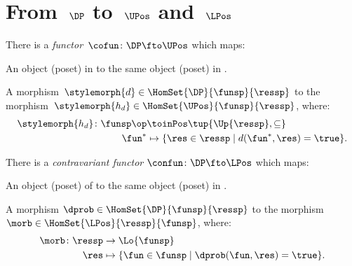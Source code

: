 \section{From~$\DP$ to~$\UPos$ and~$\LPos$}
\begin{lemma}
\label{lem:covfunctor}
There is a \emph{functor}~$\cofun\colon \DP \fto \UPos$ which maps:
\begin{compactenum}
\item An object (poset) in \DP to the same object (poset) in \UPos.
\item A morphism~$\stylemorph{d}\in \HomSet{\DP}{\funsp}{\ressp}$ to the morphism~$\stylemorph{h_d}\in \HomSet{\UPos}{\funsp}{\ressp}$, where:
\begin{equation}
\begin{aligned}
    \stylemorph{h_d}\colon \funsp\op &\toinPos \tup{\Up{\ressp},\subseteq}\\
    \fun^*&\mapsto \{\res \in \ressp\mid d(\fun^*,\res)=\true\}.
\end{aligned}
\end{equation}
\end{compactenum}
\end{lemma}

\begin{lemma}
\label{lem:confunctor}
There is a \emph{contravariant functor} $\confun\colon \DP \fto \LPos$ which maps:
\begin{compactenum}
\item An object (poset) of \DP to the same object (poset) in \LPos.
\item A morphism $\dprob \in \HomSet{\DP}{\funsp}{\ressp}$ to the morphism~$\morb\in \HomSet{\LPos}{\ressp}{\funsp}$, where:
\begin{equation*}
    \begin{aligned}
    \morb\colon \ressp &\to \Lo{\funsp}\\
    \res&\mapsto \{ \fun \in \funsp \mid \dprob(\fun,\res)=\true\}.
    \end{aligned}
\end{equation*}
\end{compactenum}
\end{lemma}


